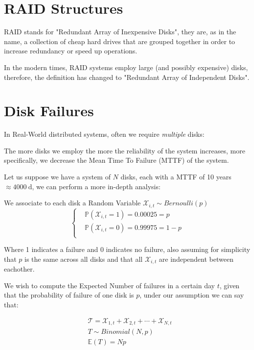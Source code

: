 \documentclass[openright, twoside]{report}
\theoremstyle{definition}
\theoremstyle{example}
\begin{document}
\section{RAID Structures}
RAID stands for "Redundant Array of Inexpensive Disks", they are, as in the name, a collection 
of cheap hard drives that are grouped together in order to increase redundancy or speed up operations.

In the modern times, RAID systems employ large (and possibly expensive) disks, therefore, the 
definition has changed to "Redundant Array of Independent Disks".

\section{Disk Failures}
In Real-World distributed systems, often we require \emph{multiple} disks:

\begin{center}
The more disks we employ the more the reliability of the system increases, more specifically, 
we decrease the Mean Time To Failure (MTTF) of the system.
\end{center}

Let us suppose we have a system of $N$ disks, each with a MTTF of 10 years $\approx \SI[group-separator = \ ]{4000}{\day}$,
we can perform a more in-depth analysis:

We associate to each disk a Random Variable $\mathcal{X}_{i,t} \sim Bernoulli(p)$
\[
\begin{cases}
	&\mathbb{P}(\mathcal{X}_{i,t} = 1) = 0.00025 = p\\
	&\mathbb{P}(\mathcal{X}_{i,t} = 0) = 0.99975 = 1-p\\
\end{cases}
\]

Where 1 indicates a failure and 0 indicates no failure, also assuming for 
simplicity that $p$ is the same across all disks and that all $\mathcal{X}_{i,t}$
are independent between eachother.

We wish to compute the Expected Number of failures in a certain day $t$, given 
that the probability of failure of one disk is $p$, under our assumption we can 
say that:

\begin{align*}
	& \mathcal{T} = \mathcal{X}_{1,t} + \mathcal{X}_{2, t} + \cdots + \mathcal{X}_{N,t}\\
	& T \sim Binomial(N, p) \\
	& \mathbb{E}(T) = Np 
\end{align*}
\end{document}
